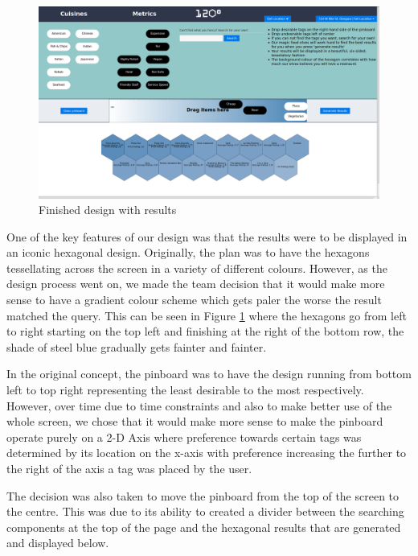 \documentclass[10pt,a4paper]{article}
\begin{document}
\begin{figure}[H]
	\begin{center}
		\includegraphics[scale=0.2]{newScreenshotWithResults.png}
		\caption{Finished design with results}
		\label{figure:finished-design-with-results}
	\end{center}
\end{figure}

One of the key features of our design was that the results were to be displayed in an iconic hexagonal design. Originally, the plan was to have the hexagons tessellating across the screen in a variety of different colours. However, as the design process went on, we made the team decision that it would make more sense to have a gradient colour scheme which gets paler the worse the result matched the query. This can be seen in Figure \ref{figure:finished-design-with-results} where the hexagons go from left to right starting on the top left and finishing at the right of the bottom row, the shade of steel blue gradually gets fainter and fainter.

In the original concept, the pinboard was to have the design running from bottom left to top right representing the least desirable to the most respectively. However, over time due to time constraints and also to make better use of the whole screen, we chose that it would make more sense to make the pinboard operate purely on a 2-D Axis where preference towards certain tags was determined by its location on the x-axis with preference increasing the further to the right of the axis a tag was placed by the user.

The decision was also taken to move the pinboard from the top of the screen to the centre. This was due to its ability to created a divider between the searching components at the top of the page and the hexagonal results that are generated and displayed below.
\end{document}
